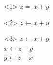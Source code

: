\documentclass[UKenglish,usenames,dvipsnames,svgnames,table,aspectratio=169,mathserif]{beamer}
\begin{document}
\begin{frame}

\begin{center}
\begin{LARGE}
\begin{overlayarea}{0.2\textwidth}{0.5\textheight}
\begin{onlyenv}<1>
$z =\ x + y$
\end{onlyenv}
\begin{onlyenv}<2>
$z \leftarrow x + y$
\end{onlyenv}
\begin{onlyenv}<3>
$z \leftarrow x + y$ \\
$x \leftarrow z - y$ \\
$y \leftarrow z - x$ \\
\end{onlyenv}
\end{overlayarea}
\end{LARGE}
\end{center}
\end{frame}
\end{document}
